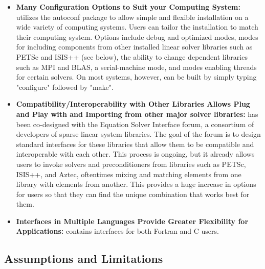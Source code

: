 \begin{itemize}
\item
{\bf Many Configuration Options to Suit your Computing System:} \hypre{} utilizes the
autoconf package to 
allow simple and flexible installation on a wide variety of computing systems.
Users can tailor the 
installation to match their computing system. Options include debug and
optimized modes, modes for 
including components from other installed linear solver libraries such as PETSc
and ISIS++ (see below), 
the ability to change dependent libraries such as MPI and BLAS, a
serial-machine mode, and modes 
enabling threads for certain solvers. On most systems, however, \hypre{} can be
built by simply typing 
"configure" followed by "make".

\item
{\bf Compatibility/Interoperability with Other Libraries Allows Plug and Play with
and Importing from 
other major solver libraries:} \hypre{} has been co-designed with the Equation
Solver Interface forum, a 
consortium of developers of sparse linear system libraries. The goal of the
forum is to design standard 
interfaces for these libraries that allow them to be compatible and
interoperable with each other. This 
process is ongoing, but it already allows \hypre{} users to invoke solvers and
preconditioners from libraries 
such as PETSc, ISIS++, and Aztec, oftentimes mixing and matching elements from
one library with 
elements from another. This provides a huge increase in options for users so
that they can find the unique 
combination that works best for them.

\item
{\bf Interfaces in Multiple Languages Provide Greater Flexibility for Applications:}
\hypre{} contains 
interfaces for both Fortran and C users.

\end{itemize}

\subsection{Assumptions and Limitations}

